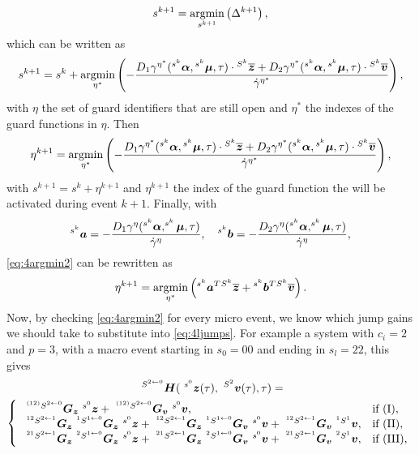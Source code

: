 \documentclass[../DC2017114Bouma.tex]{subfiles}
\begin{document}
\begin{align}
s^{k+1} = \underset{s^{k+1}}{\operatorname{\text{argmin}}}\left(\Delta^{k+1}\right),
\end{align}
which can be written as
\begin{align}
s^{k+1} = s^k + \underset{\eta^*}{\operatorname{\text{argmin}}}\left(-\frac{D_1\gamma^{\eta^*}(\hspace{0cm}^{s^k}\boldsymbol{\alpha},\hspace{0cm}^{s^k}\boldsymbol{\mu},\tau)\cdot\hspace{0cm}^{S^k}\overline{{\boldsymbol{z}}} + D_2\gamma^{\eta^*}(\hspace{0cm}^{s^k}\boldsymbol{\alpha},\hspace{0cm}^{s^k}\boldsymbol{\mu},\tau)\cdot\hspace{0cm}^{S^k}\overline{{\boldsymbol{v}}}}{\dot{\gamma}^{\eta^*}}\right),
\end{align}
with $\eta$ the set of guard identifiers that are still open and $\eta^*$ the indexes of the guard functions in $\eta$. Then
\begin{align}
\eta^{k+1} = \underset{\eta^*}{\operatorname{\text{argmin}}}\left(-\frac{D_1\gamma^{\eta^*}(\hspace{0cm}^{s^k}\boldsymbol{\alpha},\hspace{0cm}^{s^k}\boldsymbol{\mu},\tau)\cdot\hspace{0cm}^{S^k}\overline{{\boldsymbol{z}}} + D_2\gamma^{\eta^*}(\hspace{0cm}^{s^k}\boldsymbol{\alpha},\hspace{0cm}^{s^k}\boldsymbol{\mu},\tau)\cdot\hspace{0cm}^{S^k}\overline{{\boldsymbol{v}}}}{\dot{\gamma}^{\eta^*}}\right),\label{eq:4argmin2}
\end{align}
with $s^{k+1} = s^k + \eta^{k+1}$ and $\eta^{k+1}$ the index of the guard function the will be activated during event $k+1$. Finally, with
\begin{align}
^{s^k}{\boldsymbol{a}} = -\frac{D_1\gamma^{\eta}(^{s^k}\boldsymbol{\alpha},^{s^k}\boldsymbol{\mu},\tau)}{\dot{\gamma}^{\eta}},
\quad
^{s^k}{\boldsymbol{b}} = -\frac{D_2\gamma^{\eta}(^{s^k}\boldsymbol{\alpha},^{s^k}\boldsymbol{\mu},\tau)}{\dot{\gamma}^{\eta}},
\end{align}
\eqref{eq:4argmin2} can be rewritten as
\begin{align}
\eta^{k+1} = \underset{\eta^*}{\operatorname{\text{argmin}}}\left(\hspace{0cm}^{s^k}{\boldsymbol{a}}^T\hspace{0cm}^{S^k}\overline{{\boldsymbol{z}}} +\hspace{0cm}^{s^k}{\boldsymbol{b}}^T\hspace{0cm}^{S^k}\overline{{\boldsymbol{v}}}\right).
\end{align}
Now, by checking \eqref{eq:4argmin2} for every micro event, we know which jump gains we should take to substitute into \eqref{eq:4ljumps}.
For example a system with $c_i = 2$ and $p = 3$, with a macro event starting in $s_0 = 00$ and ending in $s_l = 22$, this gives 
\begin{multline}
\ ^{ S^{2\leftarrow 0}}\Hb(\ ^{s^0}\zb(\tau),\ ^{S^2}\vb(\tau),\tau) =\\ \left\lbrace\begin{array}{ll}
\ ^{^{(12)} S^{2\leftarrow 0}}\Gb_\zb\ ^{s^0}\zb + \ ^{^{(12)} S^{2\leftarrow 0}}\Gb_\vb\ ^{s^0}\vb, & \text{if }(\text{I}),\\
\ ^{^{12} S^{2\leftarrow 1}}\Gb_\zb\ ^{^{1} S^{1\leftarrow 0}}\Gb_\zb\ ^{s^0}\zb + \ ^{^{12} S^{2\leftarrow 1}}\Gb_\zb\ ^{^{1} S^{1\leftarrow 0}}\Gb_\vb\ ^{s^0}\vb + \ ^{^{12} S^{2\leftarrow 1}}\Gb_\vb\ ^{^1 S^1}\vb, & \text{if }(\text{II}),\\
\ ^{^{21} S^{2\leftarrow 1}}\Gb_\zb\ ^{^{2} S^{1\leftarrow 0}}\Gb_\zb\ ^{s^0}\zb + \ ^{^{21} S^{2\leftarrow 1}}\Gb_\zb\ ^{^{2} S^{1\leftarrow 0}}\Gb_\vb\ ^{s^0}\vb + \ ^{^{21} S^{2\leftarrow 1}}\Gb_\vb\ ^{^{2} S^1}\vb, & \text{if }(\text{III}),
\end{array}\right.\label{eq:4H2200}
\end{multline}
\end{document}
